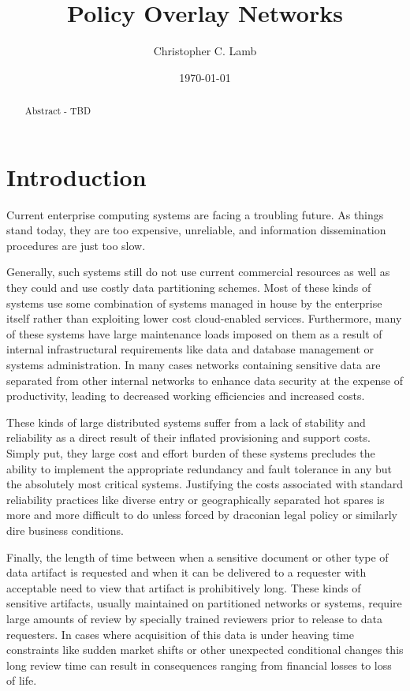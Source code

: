 \documentclass[12pt,letterpaper]{article}
\author{Christopher C. Lamb}
\title{Policy Overlay Networks}
\date{\today}
\begin{document}
\maketitle

\doublespacing

\begin{abstract}
Abstract - TBD
\end{abstract}

\section{Introduction}
Current enterprise computing systems are facing a troubling future.  As things stand today, they are too expensive, unreliable, and information dissemination procedures are just too slow.

Generally, such systems still do not use current commercial resources as well as they could and use costly data partitioning schemes.  Most of these kinds of systems use some combination of systems managed in house by the enterprise itself rather than exploiting lower cost cloud-enabled services.  Furthermore, many of these systems have large maintenance loads imposed on them as a result of internal infrastructural requirements like data and database management or systems administration.  In many cases networks containing sensitive data are separated from other internal networks to enhance data security at the expense of productivity, leading to decreased working efficiencies and increased costs.

These kinds of large distributed systems suffer from a lack of stability and reliability as a direct result of their inflated provisioning and support costs.  Simply put, they large cost and effort burden of these systems precludes the ability to implement the appropriate redundancy and fault tolerance in any but the absolutely most critical systems.  Justifying the costs associated with standard reliability practices like diverse entry or geographically separated hot spares is more and more difficult to do unless forced by draconian legal policy or similarly dire business conditions.

Finally, the length of time between when a sensitive document or other type of data artifact is requested and when it can be delivered to a requester with acceptable need to view that artifact is prohibitively long.  These kinds of sensitive artifacts, usually maintained on partitioned networks or systems, require large amounts of review by specially trained reviewers prior to release to data requesters.  In cases where acquisition of this data is under heaving time constraints like sudden market shifts or other unexpected conditional changes this long review time can result in consequences ranging from financial losses to loss of life.
\end{document}
